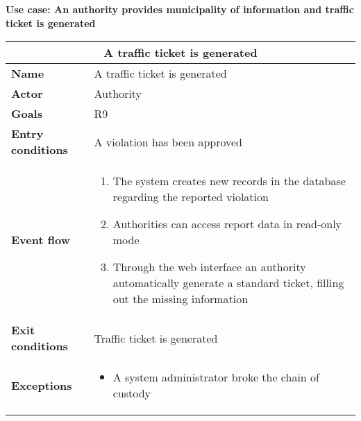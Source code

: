 \begin{description}
    \item \textbf{Use case: An authority provides municipality of information and traffic ticket is generated}
    \begin{center}
        \begin{tabular}{|p{3cm}|p{7cm}|}
            \multicolumn{2}{c}{\textbf{A traffic ticket is generated}} \\
            \hline
            \textbf{Name} & A traffic ticket is generated \\
            \hline
            \textbf{Actor} & Authority \\
            \hline
            \textbf{Goals} & R9 \\
            \hline
            \textbf{Entry conditions} & A violation has been approved \\
            \hline
            \textbf{Event flow} &
            \begin{enumerate}
                \item The system creates new records in the database regarding the reported violation
                \item Authorities can access report data in read-only mode
                \item Through the web interface an authority automatically generate a standard ticket, filling out the missing information
            \end{enumerate} \\
            \hline
            \textbf{Exit conditions} & Traffic ticket is generated \\
            \hline
            \textbf{Exceptions}
            & \begin{itemize}
                \item A system administrator broke the chain of custody
            \end{itemize} \\
            \hline
        \end{tabular}
    \end{center}
\end{description}

